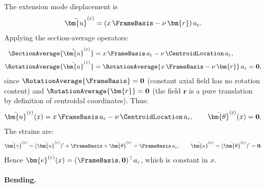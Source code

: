 The extension mode displacement is
\begin{equation*}
\hat{\bm{u}}^{(\varepsilon)} = (x\,\FrameBasis - \nu\,\bm{r})\,a_\varepsilon.
\end{equation*}
Applying the section-average operators:
\begin{align*}
\SectionAverage{\hat{\bm{u}}^{(\varepsilon)}} &= x\,\FrameBasis\,a_\varepsilon - \nu\,\CentroidLocation\,a_\varepsilon, \\
\RotationAverage{\hat{\bm{u}}^{(\varepsilon)}} &= \RotationAverage{x\,\FrameBasis - \nu\,\bm{r}}\,a_\varepsilon = \mathbf{0},
\end{align*}
since $\RotationAverage{\FrameBasis} = \mathbf{0}$ (constant axial field has no rotation content) 
and $\RotationAverage{\bm{r}} = \mathbf{0}$ (the field $\bm{r}$ is a pure translation by definition 
of centroidal coordinates). Thus:
\begin{equation*}
\bar{\bm{u}}^{(\varepsilon)}(x) = x\,\FrameBasis\,a_\varepsilon - \nu\,\CentroidLocation\,a_\varepsilon, 
\qquad 
\bar{\bm{\theta}}^{(\varepsilon)}(x) = \mathbf{0}.
\end{equation*}
The strains are:
\begin{equation*}
\bar{\bm{\gamma}}^{(\varepsilon)} = (\bar{\bm{u}}^{(\varepsilon)})' + \FrameBasis \times \bar{\bm{\theta}}^{(\varepsilon)} 
= \FrameBasis\,a_\varepsilon, 
\qquad 
\bar{\bm{\kappa}}^{(\varepsilon)} = (\bar{\bm{\theta}}^{(\varepsilon)})' = \mathbf{0}.
\end{equation*}
Hence $\bm{e}^{(\varepsilon)}(x) = (\FrameBasis, \mathbf{0})^\top a_\varepsilon$, which is constant in $x$.

\paragraph{Bending.}

